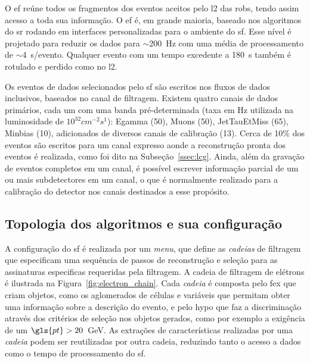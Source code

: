 O \gls{ef} reúne todos os fragmentos dos eventos aceitos pelo \gls{l2} das
\glspl{rob}, tendo assim acesso a toda sua informação. O \gls{ef} é, em grande
maioria, baseado nos algoritmos do \acrlong{sr} rodando em interfaces
personalizadas para o ambiente do \gls{sf}. Esse nível é projetado para reduzir
os dados para $\sim$200~Hz com uma média de processamento de $\sim$4~s/evento.
Qualquer evento com um tempo excedente a 180~s também é rotulado e perdido como
no \gls{l2}. 

Os eventos de dados selecionados pelo \gls{sf} são escritos nos fluxos de dados
inclusivos, baseados no canal de filtragem. Existem quatro canais de dados
primários, cada um com uma banda pré-determinada (taxa em Hz utilizada na
luminosidade de $10^{32}cm^{-2}s^{1}$): Egamma (50),
Muons (50), JetTauEtMiss (65), Minbias (10), adicionados de diversos canais
de calibração (13). Cerca de 10\% dos eventos são escritos 
para um canal expresso aonde a reconstrução pronta dos eventos é realizada, como foi dito na
Subseção~\ref{ssec:lcg}. Ainda, além da gravação de eventos completos em um
canal, é possível escrever informação parcial de um ou mais subdetectores em um
canal, o que é normalmente realizado para a calibração do detector nos canais
destinados a esse propósito.


\subsection{Topologia dos algoritmos e sua configuração}
\label{ssec:alg_topo}


A configuração do \gls{sf} é realizada por um \emph{menu}, que define as
\emph{cadeias} de filtragem que especificam uma sequência de passos de reconstrução e
seleção para as assinaturas especificas requeridas pela filtragem.
A cadeia de filtragem de elétrons é ilustrada na Figura~\ref{fig:electron_chain}.
Cada \emph{cadeia} é composta pelo \gls{fex} que criam objetos,
como os aglomerados de células e variáveis que permitam obter uma informação
sobre a descrição do evento, e pelo \gls{hypo} que faz a discriminação através dos
critérios de seleção nos objetos gerados, como por exemplo a exigência de um
$\gls{pt} > 20$~GeV. As extrações de características realizadas por uma
\emph{cadeia} podem ser reutilizadas por outra cadeia, reduzindo tanto o acesso
a dados como o tempo de processamento do \gls{sf}.

